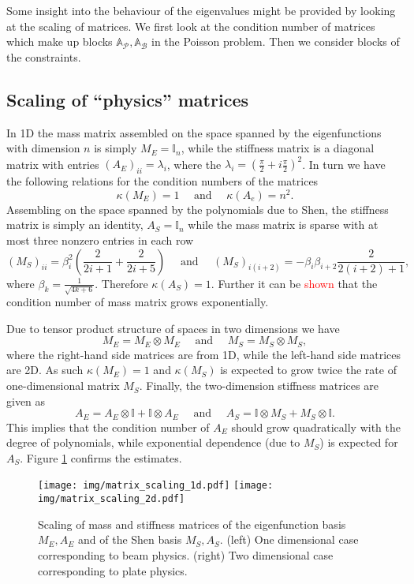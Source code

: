 \documentclass[a4paper,10pt]{article}
\newcommand{\Ap}{\ensuremath{\mathbb{A}_{\mathcal{P}}}}
\newcommand{\Ab}{\ensuremath{\mathbb{A}_{\mathcal{B}}}}
\newcommand{\TODO}[1]{\textcolor{red}{#1}}
\begin{document}
Some insight into the behaviour of the eigenvalues might be provided by looking
at the scaling of matrices. We first look at the condition number of matrices
which make up blocks $\Ap, \Ab$ in the Poisson problem. Then we consider blocks
of the constraints.

\subsection{Scaling of ``physics'' matrices}
In 1D the mass matrix assembled on the space spanned by the eigenfunctions with
dimension $n$ is simply $M_E=\mathbb{I}_n$, while the stiffness matrix is a
diagonal matrix with entries $\left(A_E\right)_{ii}=\lambda_i$, where the
$\lambda_i=\left(\frac{\pi}{2}+i\frac{\pi}{2}\right)^2$. In turn we have the
following relations for the condition numbers of the matrices
\[
\kappa(M_E)=1\quad\text{ and }\quad\kappa(A_e) = n^2.
\]
Assembling on the space spanned by the polynomials due to Shen, the stiffness
matrix is simply an identity, $A_S=\mathbb{I}_n$ while the mass matrix is
sparse with at most three nonzero entries in each row
\[
  \left(M_S\right)_{ii} = \beta_i^2\left(\frac{2}{2i+1}+\frac{2}{2i+5}\right)
  \quad{\text{ and }}\quad
  \left(M_S\right)_{i(i+2)} = -\beta_i\beta_{i+2}\frac{2}{2(i+2)+1},
\]
where $\beta_k = \frac{1}{\sqrt{4k + 6}}$. Therefore $\kappa(A_S)=1$. Further
it can be \TODO{shown} that the condition number of mass matrix grows
exponentially.

Due to tensor product structure of spaces in two dimensions we have
\[
  M_E = M_E \otimes M_E\quad\text{ and }\quad M_S = M_S \otimes M_S,
\]
where the right-hand side matrices are from 1D, while the left-hand side
matrices are 2D. As such $\kappa(M_E)=1$ and $\kappa(M_S)$ is expected to grow
twice the rate of one-dimensional matrix $M_S$. Finally, the two-dimension
stiffness matrices are given as
\[
  A_E = A_E \otimes \mathbb{I} + \mathbb{I} \otimes A_E
  \quad\text{ and }\quad 
  A_S = \mathbb{I} \otimes M_S + M_S\otimes \mathbb{I}.
\]
This implies that the condition number of $A_E$ should grow quadratically with
the degree of polynomials, while exponential dependence (due to $M_S$) is
expected for $A_S$. Figure \ref{fig:matrix_scaling} confirms the estimates.
\begin{figure}
  \begin{center}
    \texttt{[image: img/matrix\_scaling\_1d.pdf]}
    \texttt{[image: img/matrix\_scaling\_2d.pdf]}
    \caption{Scaling of mass and stiffness matrices of the eigenfunction basis
    $M_E, A_E$ and of the Shen basis $M_S, A_S$. (left) One dimensional case
  corresponding to beam physics. (right) Two dimensional case corresponding to
  plate physics.}
  \label{fig:matrix_scaling}
  \end{center}
\end{figure}
\end{document}
